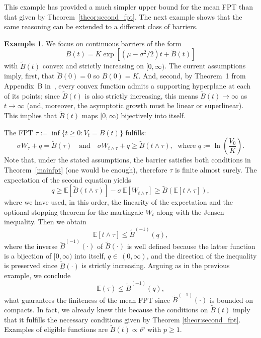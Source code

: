 \documentclass[12pt]{article}
\theoremstyle{definition}
\newtheorem{example}{Example}[theorem]
\begin{document}
This example has provided a much simpler upper bound for the mean FPT than that given by Theorem~\ref{theor:second_fpt}. The next example shows that the same reasoning can be extended to a different class of barriers.

\begin{example}
We focus on continuous barriers of the form
$$
B(t)=K\exp\left[(\mu-\sigma^2/2)t+\tilde{B}(t)\right]
$$
with $\tilde{B}(t)$ convex and strictly increasing on $[0,\infty)$. The current assumptions imply, first, that $\tilde{B}(0)=0$ so $B(0)=K$. And, second, by Theorem~1 from Appendix~B in~\cite{evanspdes}, every convex function admits a supporting hyperplane at each of its points; since $\tilde{B}(t)$ is also strictly increasing, this means $\tilde{B}(t) \to \infty$ as $t \to \infty$ (and, moreover, the asymptotic growth must be linear or superlinear). This implies that $\tilde{B}(t)$ maps $[0,\infty)$ bijectively into itself.

The FPT $\tau:=\inf\lbrace t\geq 0 : V_t=B(t)\rbrace$ fulfills:
$$
\sigma W_\tau+q=\tilde{B}(\tau)\quad\text{and}\quad\sigma W_{t\wedge\tau}+q\geq\tilde{B}(t\wedge\tau),\;\text{ where }q:=\ln\left(\frac{V_0}{K}\right).
$$
Note that, under the stated assumptions, the barrier satisfies both conditions in  Theorem~\ref{mainfpt} (one would be enough), therefore $\tau$ is finite almost surely.
The expectation of the second equation yields
\begin{equation}\nonumber
q \ge \mathbb{E}\left[\tilde{B}(t\wedge\tau)\right] - \sigma \, \mathbb{E}\left[W_{t\wedge\tau}\right]
\ge \tilde{B}\left(\mathbb{E}[t\wedge\tau]\right),
\end{equation}
where we have used, in this order, the linearity of the expectation and the optional stopping theorem for the martingale $W_t$ along with the Jensen inequality. Then we obtain
$$
\mathbb{E}[t\wedge\tau] \le \tilde{B}^{(-1)}\left(q\right),
$$
where the inverse $\tilde{B}^{(-1)}(\cdot)$ of $\tilde{B}(\cdot)$ is well defined because the latter function is a bijection of $[0,\infty)$ into itself, $q \in \, (0,\infty)$, and the direction of the inequality is preserved since $\tilde{B}(\cdot)$ is strictly increasing. Arguing as in the previous example, we conclude
$$
\mathbb{E}(\tau) \le \tilde{B}^{(-1)}\left(q\right),
$$
what guarantees the finiteness of the mean FPT since $\tilde{B}^{(-1)}\left(\cdot\right)$ is bounded on compacts.  In fact, we already knew this because the conditions on $\tilde{B}(t)$ imply that  it fulfills the necessary conditions given by Theorem \ref{theor:second_fpt}. Examples of eligible functions are $\tilde{B}(t) \propto t^p$ with $p \ge 1$.
\end{example}
\end{document}

